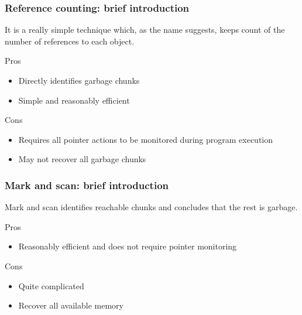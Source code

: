 \documentclass[presentation]{beamer}
\begin{document}
\begin{frame}
    \frametitle{Reference counting: brief introduction}
    \justifying
    It is a really simple technique which, as the name suggests, keeps count of the number of references to each object.
    
    \begin{exampleblock}{Pros}
        \begin{itemize}
            \item Directly identifies garbage chunks
            \item Simple and reasonably efficient
        \end{itemize}
    \end{exampleblock}
    
    \begin{alertblock}{Cons}
        \begin{itemize}
            \item Requires all pointer actions to be monitored during program execution
            \item May not recover all garbage chunks
        \end{itemize}
    \end{alertblock}
\end{frame}

\begin{frame}
    \frametitle{Mark and scan: brief introduction}
    \justifying
    Mark and scan identifies reachable chunks and concludes that the rest is garbage.
    
    \begin{exampleblock}{Pros}
        \begin{itemize}
            \item Reasonably efficient and does not require pointer monitoring
        \end{itemize}
    \end{exampleblock}
    
    \begin{alertblock}{Cons}
        \begin{itemize}
            \item Quite complicated
            \item Recover all available memory
        \end{itemize}
    \end{alertblock}
\end{frame}
\end{document}

